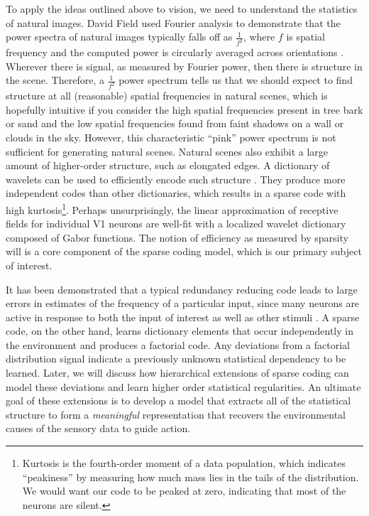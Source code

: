 To apply the ideas outlined above to vision, we need to understand the statistics of natural images.
David Field used Fourier analysis to demonstrate that the power spectra of natural images typically falls off as $\tfrac{1}{f^{2}}$, where $f$ is spatial frequency and the computed power is circularly averaged across orientations \parencite{field1987relations}.
Wherever there is signal, as measured by Fourier power, then there is structure in the scene.
Therefore, a $\tfrac{1}{f^{2}}$ power spectrum tells us that we should expect to find structure at all (reasonable) spatial frequencies in natural scenes, which is hopefully intuitive if you consider the high spatial frequencies present in tree bark or sand and the low spatial frequencies found from faint shadows on a wall or clouds in the sky.
However, this characteristic ``pink'' power spectrum is not sufficient for generating natural scenes.
Natural scenes also exhibit a large amount of higher-order structure, such as elongated edges.
A dictionary of wavelets can be used to efficiently encode such structure \parencite{field1999wavelets}.
They produce more independent codes than other dictionaries, which results in a sparse code with high kurtosis\footnote{Kurtosis is the fourth-order moment of a data population, which indicates ``peakiness'' by measuring how much mass lies in the tails of the distribution. We would want our code to be peaked at zero, indicating that most of the neurons are silent.}.
Perhaps unsurprisingly, the linear approximation of receptive fields for individual V1 neurons are well-fit with a localized wavelet dictionary composed of Gabor functions.
The notion of efficiency as measured by sparsity will is a core component of the sparse coding model, which is our primary subject of interest.

It has been demonstrated that a typical redundancy reducing code leads to large errors in estimates of the frequency of a particular input, since many neurons are active in response to both the input of interest as well as other stimuli \parencite{gardnermedwin2001limits}.
A sparse code, on the other hand, learns dictionary elements that occur independently in the environment and produces a factorial code.
Any deviations from a factorial distribution signal indicate a previously unknown statistical dependency to be learned.
Later, we will discuss how hierarchical extensions of sparse coding can model these deviations and learn higher order statistical regularities.
An ultimate goal of these extensions is to develop a model that extracts all of the statistical structure to form a \textit{meaningful} representation that recovers the environmental causes of the sensory data to guide action.


